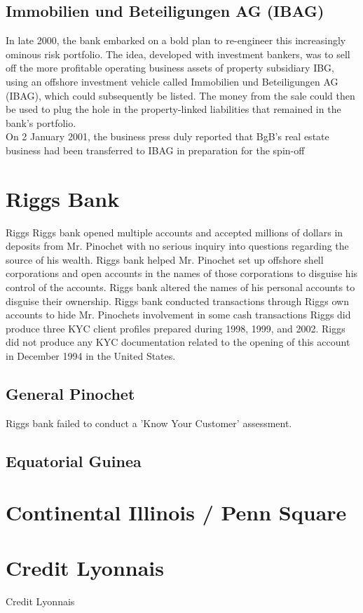 \documentclass[12pt, a4paper]{report}
\begin{document}
\subsection{Immobilien und Beteiligungen AG (IBAG)}
In late 2000, the bank embarked on a bold plan to re-engineer this
increasingly ominous risk portfolio. The idea, developed with
investment bankers, was to sell off the more profitable operating
business assets of property subsidiary IBG, using an offshore
investment vehicle called Immobilien und Beteiligungen AG (IBAG),
which could subsequently be listed. The money from the sale could
then be used to plug the hole in the property-linked liabilities
that remained in the bank's portfolio. \\On 2 January 2001, the
business press duly reported that BgB's real estate business had
been transferred to IBAG in preparation for the spin-off


\section{Riggs Bank}

Riggs Riggs bank opened multiple accounts and accepted millions of
dollars in deposits from Mr. Pinochet with no serious inquiry into
questions regarding the source of his wealth. Riggs bank helped
Mr. Pinochet set up offshore shell corporations and open accounts
in the names of those corporations to disguise his control of the
accounts. Riggs bank altered the names of his personal accounts to
disguise their ownership. Riggs bank conducted transactions
through Riggs own accounts to hide Mr. Pinochets involvement in
some cash transactions Riggs did produce three KYC client profiles
prepared during 1998, 1999, and 2002. Riggs did not produce any
KYC documentation related to the opening of this account in
December 1994 in the United States.
\subsection{General Pinochet}
Riggs bank failed to conduct a 'Know Your Customer' assessment.

\subsection{Equatorial Guinea}
\section{Continental Illinois / Penn Square}
\section{Credit Lyonnais}
Credit Lyonnais
\end{document}
